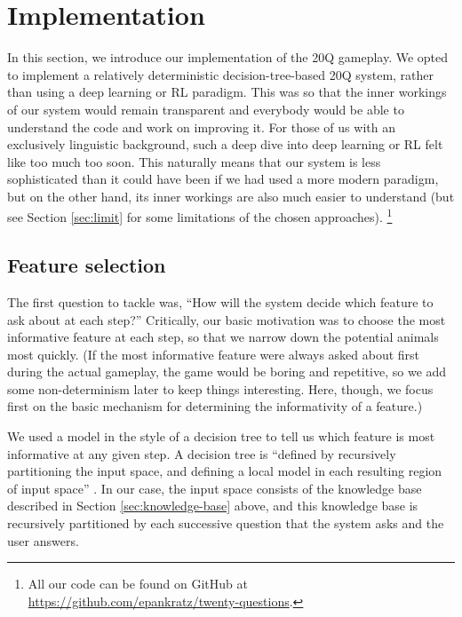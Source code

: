 \documentclass[11pt,a4paper]{article}
\begin{document}
\section{Implementation}
\label{sec:impl}

In this section, we introduce our implementation of the 20Q gameplay.
We opted to implement a relatively deterministic decision-tree-based 20Q system, rather than using a deep learning or RL paradigm.
This was so that the inner workings of our system would remain transparent and everybody would be able to understand the code and work on improving it.
For those of us with an exclusively linguistic background, such a deep dive into deep learning or RL felt like too much too soon.
This naturally means that our system is less sophisticated than it could have been if we had used a more modern paradigm, but on the other hand, its inner workings are also much easier to understand (but see Section \ref{sec:limit} for some limitations of the chosen approaches).%
    \footnote{All our code can be found on GitHub at \url{https://github.com/epankratz/twenty-questions}.}

\subsection{Feature selection}
\label{subsec:featselec}

The first question to tackle was, ``How will the system decide which feature to ask about at each step?''
Critically, our basic motivation was to choose the most informative feature at each step, so that we narrow down the potential animals most quickly.
(If the most informative feature were always asked about first during the actual gameplay, the game would be boring and repetitive, so we add some non-determinism later to keep things interesting.
Here, though, we focus first on the basic mechanism for determining the informativity of a feature.)

We used a model in the style of a decision tree to tell us which feature is most informative at any given step.
A decision tree is ``defined by recursively partitioning the input space, and defining a local model in each resulting region of input space'' \citep[545]{Murphy2012}.
In our case, the input space consists of the knowledge base described in Section \ref{sec:knowledge-base} above, and this knowledge base is recursively partitioned by each successive question that the system asks and the user answers.
\end{document}
